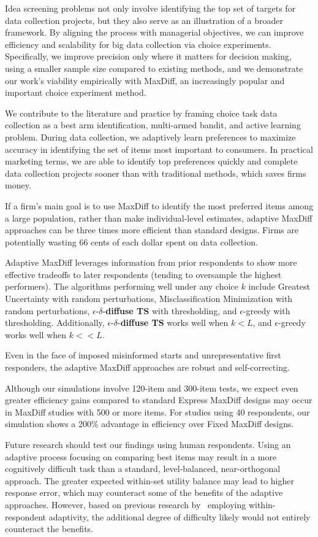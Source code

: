 \documentclass[a4paper,11pt]{article}
\newcommand{\edts}{$\epsilon$-$\delta$-\textbf{diffuse TS} }
\begin{document}
Idea screening problems not only involve identifying the top set of targets for data collection projects, but they also serve as an illustration of a broader framework. By aligning the process with managerial objectives, we can improve efficiency and scalability for big data collection via choice experiments. Specifically, we improve precision only where it matters for decision making, using a smaller sample size compared to existing methods, and we demonstrate our work's viability empirically with MaxDiff, an increasingly popular and important choice experiment method.

We contribute to the literature and practice by framing choice task data collection as a best arm identification, multi-armed bandit, and active learning problem. During data collection, we adaptively learn preferences to maximize accuracy in identifying the set of items most important to consumers. In practical marketing terms, we are able to identify top preferences quickly and complete data collection projects sooner than with traditional methods, which saves firms money. 

If a firm's main goal is to use MaxDiff to identify the most preferred items among a large population, rather than make individual-level estimates, adaptive MaxDiff approaches can be three times more efficient than standard designs. Firms are potentially wasting 66 cents of each dollar spent on data collection.

Adaptive MaxDiff leverages information from prior respondents to show more effective tradeoffs to later respondents (tending to oversample the highest performers). The algorithms performing well under any choice $k$ include Greatest Uncertainty with random perturbations, Misclassification Minimization with random perturbations, \edts with thresholding, and $\epsilon$-greedy with thresholding. Additionally, \edts works well when $k<L$, and $\epsilon$-greedy works well when $k<<L$.

Even in the face of imposed misinformed starts  and unrepresentative first responders, the adaptive MaxDiff approaches are robust and self-correcting.

Although our simulations involve 120-item and 300-item tests, we expect even greater efficiency gains compared to standard Express MaxDiff designs may occur in MaxDiff studies with 500 or more items. For studies using 40 respondents, our simulation shows a 200\% advantage in efficiency over Fixed MaxDiff designs.

Future research should test our findings using human respondents. Using an adaptive process focusing on comparing best items may result in a more cognitively difficult task than a standard, level-balanced, near-orthogonal approach.  The greater expected within-set utility balance may lead to higher response error, which may counteract some of the benefits of the adaptive approaches.  However, based on previous research by~\cite{orme2006adaptive} employing within-respondent adaptivity, the additional degree of difficulty likely would not entirely counteract the benefits.
\end{document}
